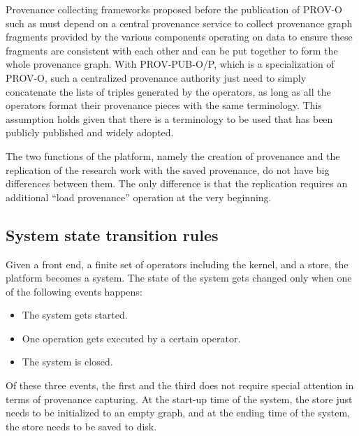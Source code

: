 Provenance collecting frameworks proposed before the publication of PROV-O such as \cite{simmhan2006framework} must depend on a central provenance service to collect provenance graph fragments provided by the various components operating on data to ensure these fragments are consistent with each other and can be put together to form the whole provenance graph. With PROV-PUB-O/P, which is a specialization of PROV-O, such a centralized provenance authority just need to simply concatenate the lists of triples generated by the operators, as long as all the operators format their provenance pieces with the same terminology. This assumption holds given that there is a terminology to be used that has been publicly published and widely adopted.

The two functions of the platform, namely the creation of provenance and the replication of the research work with the saved provenance, do not have big differences between them. The only difference is that the replication requires an additional ``load provenance'' operation at the very beginning.

\subsection{System state transition rules}
\label{sec:transition}
Given a front end, a finite set of operators including the kernel, and a store, the platform becomes a system. The state of the system gets changed only when one of the following events happens:
\begin{itemize}
	\item The system gets started.
	\item One operation gets executed by a certain operator.
	\item The system is closed.
\end{itemize}
Of these three events, the first and the third does not require special attention in terms of provenance capturing. At the start-up time of the system, the store just needs to be initialized to an empty graph, and at the ending time of the system, the store needs to be saved to disk.

